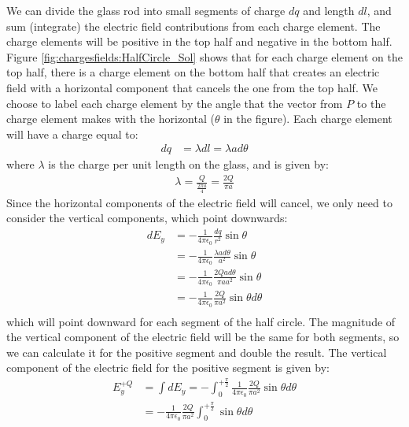\begin{solution}
We can divide the glass rod into small segments of charge $dq$ and length $dl$, and sum (integrate) the electric field contributions from each charge element. The charge elements will be positive in the top half and negative in the bottom half. Figure \ref{fig:chargesfields:HalfCircle_Sol} shows that for each charge element on the top half, there is a charge element on the bottom half that creates an electric field with a horizontal component that cancels the one from the top half. 
We choose to label each charge element by the angle that the vector from $P$ to the charge element makes with the horizontal ($\theta$ in the figure). Each charge element will have a charge equal to:
\begin{align*}
dq&=\lambda dl=\lambda ad\theta
\end{align*}
where $\lambda$ is the charge per unit length on the glass, and is given by:
\begin{align*}
\lambda=\frac{Q}{\frac{2\pi a}{4}}=\frac{2Q}{\pi a}
\end{align*}
Since the horizontal components of the electric field will cancel, we only need to consider the vertical components, which point downwards:
\begin{align*}
dE_y&=-\frac{1}{4\pi\epsilon_0}\frac{dq}{r^2}\sin\theta\\
&=-\frac{1}{4\pi\epsilon_0}\frac{\lambda ad\theta}{a^2}\sin\theta \\
&=-\frac{1}{4\pi\epsilon_0}\frac{2Q ad\theta}{\pi a a^2}\sin\theta \\
&=-\frac{1}{4\pi\epsilon_0}\frac{2Q}{\pi a^2}\sin\theta d\theta \\
\end{align*}
which will point downward for each segment of the half circle. The magnitude of the vertical component of the electric field will be the same for both segments, so we can calculate it for the positive segment and double the result. The vertical component of the electric field for the positive segment is given by:
\begin{align*}
E_y^{+Q} &= \int dE_y=-\int_{0}^{+\frac{\pi}{2}}\frac{1}{4\pi\epsilon_0}\frac{2Q}{\pi a^2}\sin\theta d\theta \\
&=-\frac{1}{4\pi\epsilon_0}\frac{2Q}{\pi a^2}\int_{0}^{+\frac{\pi}{2}}\sin\theta d\theta \\

\end{align*}
\end{solution}
